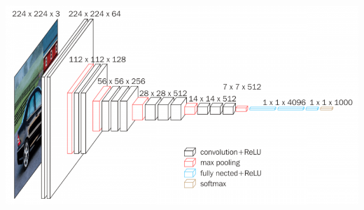 \documentclass[11pt, a4paper]{article}
\begin{document}
\begin{spacing}{1.1}
	\begin{center}	\includegraphics[scale=.4]{vgg_16} 	\end{center} \newpage


\end{spacing}
\end{document}
